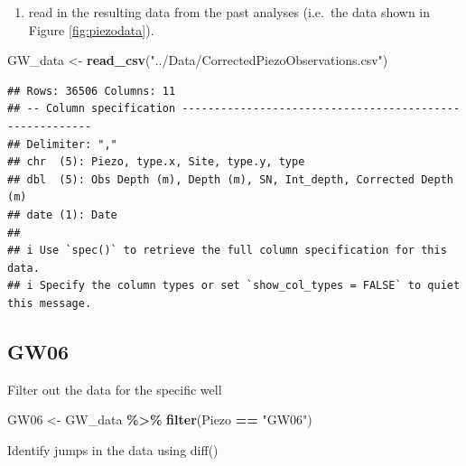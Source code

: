\documentclass[
]{article}
\newenvironment{Shaded}{\begin{snugshade}}{\end{snugshade}}
\newcommand{\AttributeTok}[1]{\textcolor[rgb]{0.13,0.29,0.53}{#1}}
\newcommand{\DecValTok}[1]{\textcolor[rgb]{0.00,0.00,0.81}{#1}}
\newcommand{\FunctionTok}[1]{\textcolor[rgb]{0.13,0.29,0.53}{\textbf{#1}}}
\newcommand{\NormalTok}[1]{#1}
\newcommand{\OtherTok}[1]{\textcolor[rgb]{0.56,0.35,0.01}{#1}}
\newcommand{\SpecialCharTok}[1]{\textcolor[rgb]{0.81,0.36,0.00}{\textbf{#1}}}
\newcommand{\StringTok}[1]{\textcolor[rgb]{0.31,0.60,0.02}{#1}}
\providecommand{\tightlist}{%
  \setlength{\itemsep}{0pt}\setlength{\parskip}{0pt}}
\begin{document}
\begin{enumerate}
\def\labelenumi{\arabic{enumi}.}
\setcounter{enumi}{1}
\tightlist
\item
  read in the resulting data from the past analyses (i.e.~the data shown
  in Figure \ref{fig:piezodata}).
\end{enumerate}

\begin{Shaded}
\begin{Highlighting}[]
\NormalTok{GW\_data }\OtherTok{\textless{}{-}} \FunctionTok{read\_csv}\NormalTok{(}\StringTok{"../Data/CorrectedPiezoObservations.csv"}\NormalTok{)}
\end{Highlighting}
\end{Shaded}

\begin{verbatim}
## Rows: 36506 Columns: 11
## -- Column specification --------------------------------------------------------
## Delimiter: ","
## chr  (5): Piezo, type.x, Site, type.y, type
## dbl  (5): Obs Depth (m), Depth (m), SN, Int_depth, Corrected Depth (m)
## date (1): Date
## 
## i Use `spec()` to retrieve the full column specification for this data.
## i Specify the column types or set `show_col_types = FALSE` to quiet this message.
\end{verbatim}

\subsection{GW06}\label{gw06}

Filter out the data for the specific well

\begin{Shaded}
\begin{Highlighting}[]
\NormalTok{GW06 }\OtherTok{\textless{}{-}}\NormalTok{ GW\_data }\SpecialCharTok{\%\textgreater{}\%}
  \FunctionTok{filter}\NormalTok{(Piezo }\SpecialCharTok{==} \StringTok{"GW06"}\NormalTok{)}
\end{Highlighting}
\end{Shaded}

Identify jumps in the data using diff()

\begin{Shaded}
\end{Shaded}
\end{document}
